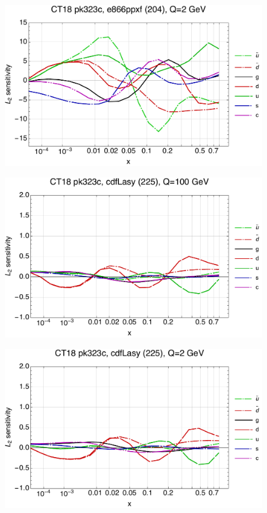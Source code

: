 \documentclass[10pt,aps,prd,floatfix,titlepage]{revtex4}
\begin{document}
\begin{figure}
\includegraphics[width=\textwidth,height=0.44\textheight,keepaspectratio]{1/204_ct18nn_L2_q2_Sf_1.pdf}
\caption{}
\end{figure}
\clearpage
\begin{figure}
\includegraphics[width=\textwidth,height=0.44\textheight,keepaspectratio]{1/225_ct18nn_L2_q100_Sf_1.pdf}
\caption{}
\end{figure}
\begin{figure}
\includegraphics[width=\textwidth,height=0.44\textheight,keepaspectratio]{1/225_ct18nn_L2_q2_Sf_1.pdf}
\caption{}
\end{figure}
\end{document}
